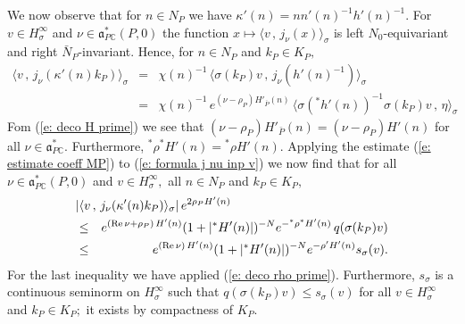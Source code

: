 \documentclass[12pt,a4paper]{article}
\def\msy#1{{\mathbb #1}}
\def\C{{\msy C}}
\def\gs{\sigma}
\def\got#1{\mathfrak #1}
\def\fa{{\got a}}
\def\Re{{\rm Re}\,}
\def\inp#1#2{\langle#1\,,\,#2\rangle}
\def\iC{{\scriptscriptstyle \C}}
\numberwithin{Thm}{section}
\numberwithin{equation}{section}
\def\faPdc{{\fa_{P\iC}^*}}
\numberwithin{equation}{section}
\def\faPdc{\fa_{P\iC}^*}
\def\cchi{\chi}
\begin{document}
We now observe that for $n \in N_P$ we have  
$\kappa'(n) = n n'(n)^{-1} h'(n)^{-1}.$
For $v \in H_\gs^\infty$ and $\nu \in \faPdc(P,0)$ the function 
$x \mapsto  \inp{v}{j_\nu(x)}_\gs$ is left $N_{0}$-equivariant and right $\bar N_P$-invariant. 
Hence, for $n \in N_P$ and $k_P\in K_P,$ 
\begin{eqnarray}
\nonumber
\inp{v}{j_\nu(\kappa'(n) k_P)}_\gs & = & 
\cchi(n)^{-1} \, \inp{\gs(k_P)v}{j_\nu(h'(n)^{-1})}_\gs\\
&=& \cchi(n)^{-1} \, e^{(\nu - \rho_P)H'_{\bar P}(n)} \,  \inp{\gs({}^*h'(n))^{-1}\gs(k_P)v}{\eta}_\gs
\label{e: formula j nu inp v}
\end{eqnarray}
Fom (\ref{e: deco H prime}) we see that $(\nu -\rho_P)H'_{\bar P}(n) = (\nu -\rho_P) H'(n)$ 
for all $\nu \in \faPdc.$ Furthermore, ${}^*\rho {}^*H'(n) = {}^* \rho H'(n).$ 
Applying the estimate (\ref{e: estimate coeff MP}) to (\ref{e: formula j nu inp v}) 
we now find that 
for all $\nu \in \faPdc(P,0)$ and $v \in H_\gs^\infty,$ all $n \in N_P$ and $k_P\in K_P,$ 
\begin{eqnarray} 
\nonumber
\lefteqn{| \inp{v}{j_\nu(\kappa'(n) k_P)}_\gs|  \,e^{2 \rho_P  H'(n)} }\\
\nonumber
&\leq& 
e^{(\Re \nu +  \rho_P)\,H'(n)}(1 + |{}^*H'(n)|)^{-N} e^{-{}^*\rho {}^*H'(n)}\,q(\gs(k_P)v) \\
&\leq& e^{(\Re \nu)\,H'(n)}(1 + |{}^*H'(n)|)^{-N} e^{-\rho' H'(n)} s_\gs(v).
\label{e: estimate f of kappa prime n}
\end{eqnarray}
For the last inequality we have applied (\ref{e: deco rho prime}).
Furthermore, $s_\gs$ is a continuous seminorm on 
$H_\gs^{\infty}$ such that $q(\gs(k_P)v) \leq s_\gs (v)$ for all $v \in H_\gs^\infty$ and $k_P \in K_P;$ 
it exists by compactness of $K_P.$ 
\end{document}
